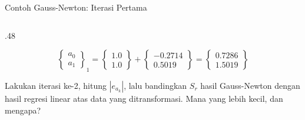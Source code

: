 \documentclass[aspectratio=169,10pt]{beamer}
\begin{document}
\begin{frame}{Contoh Gauss-Newton: Iterasi Pertama}
\begin{columns}[T,totalwidth=\textwidth]
\begin{column}{.48\textwidth}
\begin{purplebox}
\[
\begin{Bmatrix}a_0\\ a_1\end{Bmatrix}_{1}
=\begin{Bmatrix}1.0\\ 1.0\end{Bmatrix}+\begin{Bmatrix}-0.2714\\ 0.5019\end{Bmatrix}
=\begin{Bmatrix}0.7286\\ 1.5019\end{Bmatrix}
\]
\end{purplebox}
\begin{goldbox}
Lakukan iterasi ke-2, hitung $|e_{a_k}|$, lalu bandingkan $S_r$ hasil Gauss-Newton dengan hasil regresi linear atas data yang ditransformasi. Mana yang lebih kecil, dan mengapa?
\end{goldbox}
\end{column}
\end{columns}
\end{frame}
\end{document}
